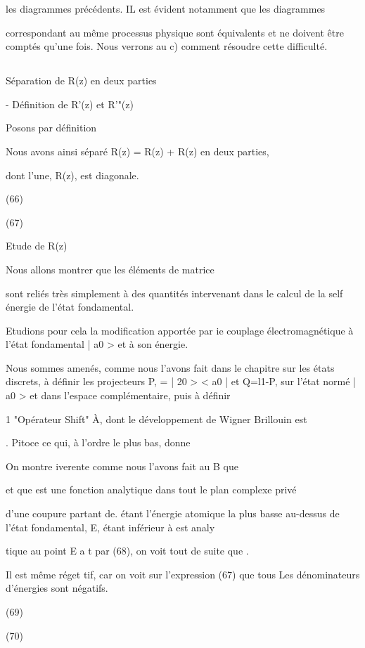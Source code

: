 les diagrammes précédents. IL est évident notamment que les diagrammes

correspondant au même processus physique sont équivalents et ne doivent être
comptés qu'une fois. Nous verrons au c) comment résoudre cette difficulté.
\subsection{} Séparation de R(z) en deux parties%

- Définition de R'(z) et R'"(z)

Posons par définition

Nous avons ainsi séparé R(z) = R(z) + R(z) en deux parties,

dont l'une, R(z), est diagonale.

(66)

(67)

Etude de R(z)

Nous allons montrer que les éléments de matrice

sont reliés très simplement à des quantités intervenant dans le calcul de la
self énergie de l'état fondamental.

Etudions pour cela la modification apportée par ie couplage
électromagnétique à l'état fondamental | a0 > et à son énergie.

Nous sommes amenés, comme nous l'avons fait dans le chapitre sur
les états discrets, à définir les projecteurs P, = | 20 > < a0 | et Q=l1-P,
sur l'état normé | a0 > et dans l'espace complémentaire, puis à définir

1 "Opérateur Shift" À, dont le développement de Wigner Brillouin est

. Pitoce
ce qui, à l'ordre le plus bas, donne

On montre iverente comme nous l'avons fait au  B que

et que  est une fonction analytique dans tout le plan complexe privé

d'une coupure partant de. étant l'énergie atomique la plus basse
au-dessus de l'état fondamental, E, étant inférieur à est analy



tique au point E a t par (68), on voit tout de suite que .

Il est même réget tif, car on voit sur l'expression (67) que tous Les dénominateurs d'énergies  sont négatifs.

(69)

(70)

